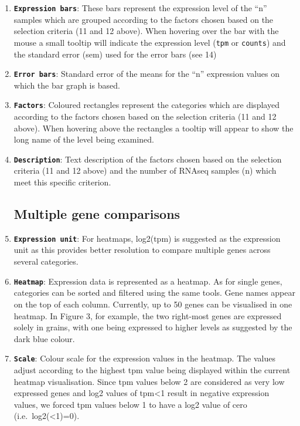 \begin{enumerate}
\item
  \textbf{\lstinline!Expression bars!}: These bars represent the
  expression level of the ``n'' samples which are grouped according to
  the factors chosen based on the selection criteria (11 and 12 above).
  When hovering over the bar with the mouse a small tooltip will
  indicate the expression level (\lstinline!tpm! or \lstinline!counts!)
  and the standard error (sem) used for the error bars (see 14)
\item
  \textbf{\lstinline!Error bars!}: Standard error of the means for the
  ``n'' expression values on which the bar graph is based.
\item
  \textbf{\lstinline!Factors!}: Coloured rectangles represent the
  categories which are displayed according to the factors chosen based
  on the selection criteria (11 and 12 above). When hovering above the
  rectangles a tooltip will appear to show the long name of the level
  being examined.
\item
  \textbf{\lstinline!Description!}: Text description of the factors
  chosen based on the selection criteria (11 and 12 above) and the
  number of RNAseq samples (n) which meet this specific criterion.

  \subsection{\textbf{Multiple gene
  comparisons}}\label{multiple-gene-comparisons}
\item
  \textbf{\lstinline!Expression unit!}: For heatmaps, log2(tpm) is
  suggested as the expression unit as this provides better resolution to
  compare multiple genes across several categories.
\item
  \textbf{\lstinline!Heatmap!}: Expression data is represented as a
  heatmap. As for single genes, categories can be sorted and filtered
  using the same tools. Gene names appear on the top of each column.
  Currently, up to 50 genes can be visualised in one heatmap. In Figure
  3, for example, the two right-most genes are expressed solely in
  grains, with one being expressed to higher levels as suggested by the
  dark blue colour.
\item
  \textbf{\lstinline!Scale!}: Colour scale for the expression values in
  the heatmap. The values adjust according to the highest tpm value
  being displayed within the current heatmap visualisation. Since tpm
  values below 2 are considered as very low expressed genes and log2
  values of tpm\textless{}1 result in negative expression values, we
  forced tpm values below 1 to have a log2 value of cero
  (i.e.~log2(\textless{}1)=0).
\end{enumerate}

